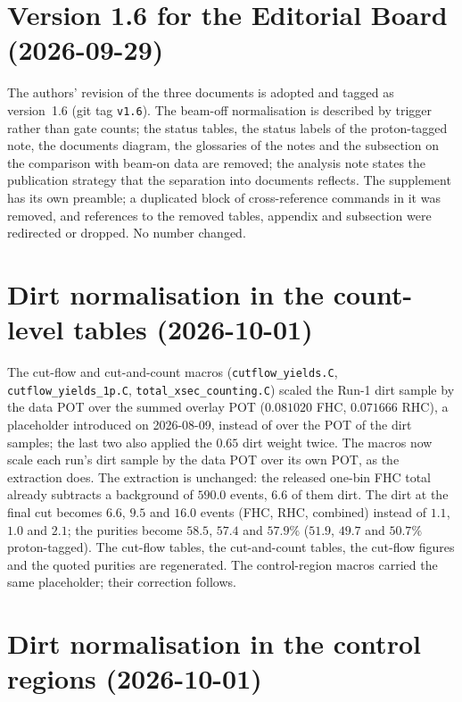 \section{Version 1.6 for the Editorial Board (2026-09-29)}

The authors' revision of the three documents is adopted and tagged as version~1.6 (git tag
\texttt{v1.6}). The beam-off normalisation is described by trigger rather than gate counts; the
status tables, the status labels of the proton-tagged note, the documents diagram, the glossaries of the
notes and the subsection on the comparison with beam-on data are removed; the analysis note states the
publication strategy that the separation into documents reflects. The supplement has its own preamble;
a duplicated block of cross-reference commands in it was removed, and references to the removed tables,
appendix and subsection were redirected or dropped. No number changed.

\section{Dirt normalisation in the count-level tables (2026-10-01)}

The cut-flow and cut-and-count macros (\texttt{cutflow\_yields.C}, \texttt{cutflow\_yields\_1p.C},
\texttt{total\_xsec\_counting.C}) scaled the Run-1 dirt sample by the data POT over the summed overlay POT
($0.081020$ FHC, $0.071666$ RHC), a placeholder introduced on 2026-08-09, instead of over the POT of the dirt
samples; the last two also applied the $0.65$ dirt weight twice. The macros now scale each run's dirt
sample by the data POT over its own POT, as the extraction does. The extraction is unchanged: the released
one-bin FHC total already subtracts a background of $590.0$ events, $6.6$ of them dirt. The dirt at the final
cut becomes $6.6$, $9.5$ and $16.0$ events (FHC, RHC, combined) instead of $1.1$, $1.0$ and $2.1$; the
purities become $58.5$, $57.4$ and $57.9\%$ ($51.9$, $49.7$ and $50.7\%$ proton-tagged). The cut-flow tables,
the cut-and-count tables, the cut-flow figures and the quoted purities are regenerated. The control-region
macros carried the same placeholder; their correction follows.

\section{Dirt normalisation in the control regions (2026-10-01)}

